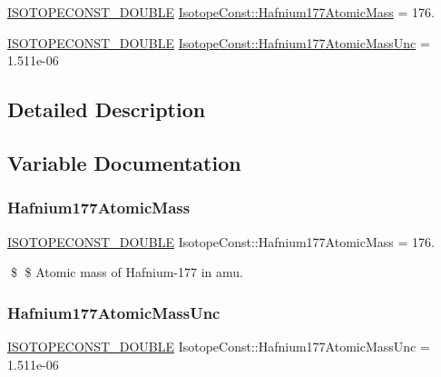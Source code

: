 \begin{DoxyCompactItemize}
\item 
\mbox{\hyperlink{group___isotope_const-_macros_ga8f45a7272ce02c0b4c65c44636ed719a}{I\+S\+O\+T\+O\+P\+E\+C\+O\+N\+S\+T\+\_\+\+D\+O\+U\+B\+LE}} \mbox{\hyperlink{group___isotope_const-_hafnium-_hf177_ga07b6e6d03b45f6c51265a62f9d665dbe}{Isotope\+Const\+::\+Hafnium177\+Atomic\+Mass}} = 176.
\item 
\mbox{\hyperlink{group___isotope_const-_macros_ga8f45a7272ce02c0b4c65c44636ed719a}{I\+S\+O\+T\+O\+P\+E\+C\+O\+N\+S\+T\+\_\+\+D\+O\+U\+B\+LE}} \mbox{\hyperlink{group___isotope_const-_hafnium-_hf177_ga2f850200c7473eaa97728131f3fe3d3b}{Isotope\+Const\+::\+Hafnium177\+Atomic\+Mass\+Unc}} = 1.\+511e-\/06
\end{DoxyCompactItemize}


\subsection{Detailed Description}


\subsection{Variable Documentation}
\mbox{\label{group___isotope_const-_hafnium-_hf177_ga07b6e6d03b45f6c51265a62f9d665dbe}} 
\subsubsection{\texorpdfstring{Hafnium177\+Atomic\+Mass}{Hafnium177AtomicMass}}
{\footnotesize\ttfamily \mbox{\hyperlink{group___isotope_const-_macros_ga8f45a7272ce02c0b4c65c44636ed719a}{I\+S\+O\+T\+O\+P\+E\+C\+O\+N\+S\+T\+\_\+\+D\+O\+U\+B\+LE}} Isotope\+Const\+::\+Hafnium177\+Atomic\+Mass = 176.}

\$ \$ Atomic mass of Hafnium-\/177 in amu. \mbox{\label{group___isotope_const-_hafnium-_hf177_ga2f850200c7473eaa97728131f3fe3d3b}} 
\subsubsection{\texorpdfstring{Hafnium177\+Atomic\+Mass\+Unc}{Hafnium177AtomicMassUnc}}
{\footnotesize\ttfamily \mbox{\hyperlink{group___isotope_const-_macros_ga8f45a7272ce02c0b4c65c44636ed719a}{I\+S\+O\+T\+O\+P\+E\+C\+O\+N\+S\+T\+\_\+\+D\+O\+U\+B\+LE}} Isotope\+Const\+::\+Hafnium177\+Atomic\+Mass\+Unc = 1.\+511e-\/06}

